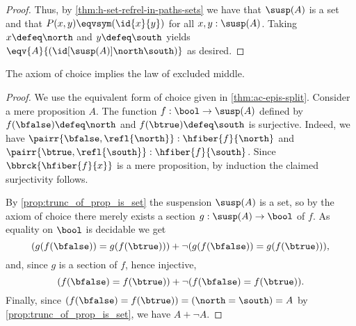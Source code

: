 \begin{proof}
Thus, by \cref{thm:h-set-refrel-in-paths-sets} we have that $\susp(A)$ is a set and that $P(x,y) \eqvsym (\id{x}{y})$ for all $x,y:\susp(A)$.
Taking $x\defeq \north$ and $y\defeq \south$ yields $\eqv{A}{(\id[\susp(A)]\north\south)}$ as desired.
\end{proof}

\begin{thm}[Diaconescu]\label{thm:1surj_to_surj_to_pem}
  The axiom of choice implies the law of excluded middle.
\end{thm}

\begin{proof}
We use the equivalent form of choice given in \cref{thm:ac-epis-split}.
Consider a mere proposition $A$.
The function $f:\bool\to\susp(A)$ defined by
$f(\bfalse) \defeq \north$ and $f(\btrue) \defeq \south$
is surjective.
Indeed, we have
$\pairr{\bfalse,\refl{\north}} : \hfiber{f}{\north}$
and $\pairr{\btrue,\refl{\south}} :\hfiber{f}{\south}$.
Since $\bbrck{\hfiber{f}{x}}$ is a mere proposition, by induction the claimed surjectivity follows.

By \cref{prop:trunc_of_prop_is_set} the suspension $\susp(A)$
is a set, so by the axiom of choice there merely exists a
section $g: \susp(A) \to \bool$ of $f$.
As equality on $\bool$ is decidable we get
\begin{equation*}
 (g(f(\bfalse))= g(f(\btrue))) +
 \lnot (g(f(\bfalse))= g(f(\btrue))),
\end{equation*}
and, since $g$ is a section of $f$, hence injective,
\begin{equation*}
(f(\bfalse) = f(\btrue)) +
\lnot (f(\bfalse) = f(\btrue)).
\end{equation*}
Finally, since $(f(\bfalse)=f(\btrue)) = (\north=\south) = A$ by \cref{prop:trunc_of_prop_is_set}, we have $A+\neg A$.
\end{proof}





